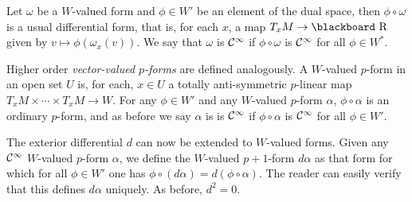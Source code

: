 \documentclass[12pt,titlepage]{article}
\def\bbf#1{\hbox{\blackboard #1}}
\def\lR{\bbf R}
\def\cC{{\cal C}}
\begin{document}
Let \(\omega\) be a
\(W\)-valued form and \(\phi\in W'\) be an element of the dual space,
then \(\phi\circ \omega\)
is a usual differential form, that is, for each \(x\), 
a map \(T_xM \to \lR\) given by
\(v\mapsto \phi(\omega_x(v))\). We say that \(\omega \) is \(\cC^\infty\)
if \(\phi\circ \omega\) is \(\cC^\infty\) for all  \(\phi\in W^*\).

Higher order {\em vector-valued \(p\)-forms\/}
 are defined analogously. 
A \(W\)-valued \(p\)-form in
an open set \(U\) is, for each, 
\(x\in U\)  a totally anti-symmetric \(p\)-linear map \(T_xM \times
\cdots\times T_xM\to W\). 
For any \(\phi\in W'\) and any \(W\)-valued
\(p\)-form \(\alpha\), \(\phi\circ \alpha\) is an ordinary \(p\)-form,
and as before we say \(\alpha\) is is \(\cC^\infty\)
if \(\phi\circ \alpha\) is \(\cC^\infty\) for all  \(\phi\in W'\).

The exterior differential \(d\) can now be extended to \(W\)-valued
forms. Given any \(\cC^\infty\) \(W\)-valued
\(p\)-form \(\alpha\), we define the \(W\)-valued \(p+1\)-form \(d\alpha\)
as that form for which for all \(\phi\in W'\) one has
\(\phi\circ (d\alpha)=d(\phi\circ\alpha)\). The
reader can easily verify that this defines  \(d\alpha\) uniquely. As
before, \(d^2=0\).


\printindex
\end{document}
